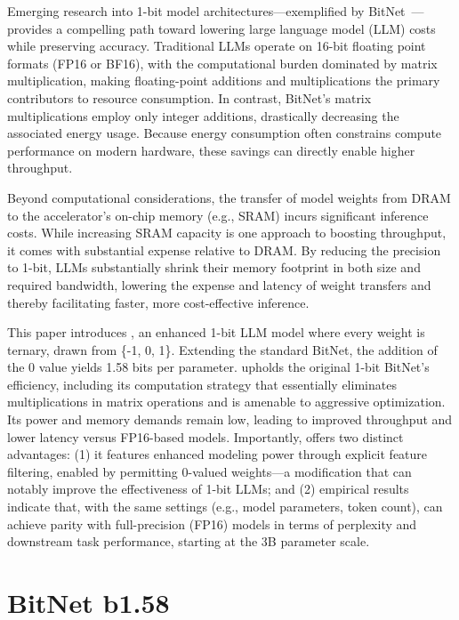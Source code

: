 Emerging research into 1-bit model architectures—exemplified by BitNet~\cite{bitnet}—provides a compelling path toward lowering large language model (LLM) costs while preserving accuracy. Traditional LLMs operate on 16-bit floating point formats (FP16 or BF16), with the computational burden dominated by matrix multiplication, making floating-point additions and multiplications the primary contributors to resource consumption. In contrast, BitNet’s matrix multiplications employ only integer additions, drastically decreasing the associated energy usage. Because energy consumption often constrains compute performance on modern hardware, these savings can directly enable higher throughput.

Beyond computational considerations, the transfer of model weights from DRAM to the accelerator’s on-chip memory (e.g., SRAM) incurs significant inference costs. While increasing SRAM capacity is one approach to boosting throughput, it comes with substantial expense relative to DRAM. By reducing the precision to 1-bit, LLMs substantially shrink their memory footprint in both size and required bandwidth, lowering the expense and latency of weight transfers and thereby facilitating faster, more cost-effective inference.

This paper introduces \textbf{}, an enhanced 1-bit LLM model where every weight is ternary, drawn from \{-1, 0, 1\}. Extending the standard BitNet, the addition of the 0 value yields 1.58 bits per parameter.  upholds the original 1-bit BitNet’s efficiency, including its computation strategy that essentially eliminates multiplications in matrix operations and is amenable to aggressive optimization. Its power and memory demands remain low, leading to improved throughput and lower latency versus FP16-based models. Importantly,  offers two distinct advantages: (1) it features enhanced modeling power through explicit feature filtering, enabled by permitting 0-valued weights—a modification that can notably improve the effectiveness of 1-bit LLMs; and (2) empirical results indicate that, with the same settings (e.g., model parameters, token count),  can achieve parity with full-precision (FP16) models in terms of perplexity and downstream task performance, starting at the 3B parameter scale.

\section{BitNet b1.58}

